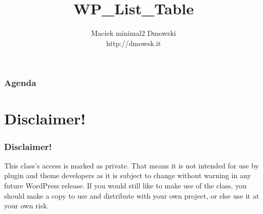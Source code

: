 \documentclass[a4paper, 16pt]{beamer}
\begin{document}
	\title{WP\_List\_Table}
	\author{Maciek minimal2 Dmowski\\ http://dmowsk.it}
	\begin{frame}
		\titlepage
	\end{frame}
	\begin{frame}
		\frametitle{Agenda}
		\tableofcontents
	\end{frame}
	\section{Disclaimer!}
		\begin{frame}
			\frametitle{Disclaimer!}
			{\color{red} This class's access is marked as private. That means it is not intended for use by plugin and theme developers as it is subject to change without warning in any future WordPress release. If you would still like to make use of the class, you should make a copy to use and distribute with your own project, or else use it at your own risk.}
		\end{frame}
\end{document}
